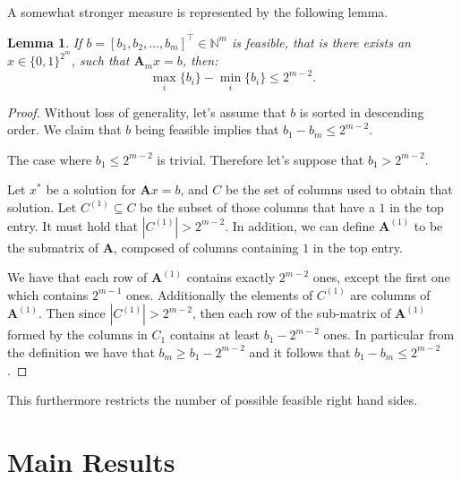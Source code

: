 \documentclass{article}
\newtheorem{lemma}[theorem]{Lemma}
\begin{document}
A somewhat stronger measure is represented by the following lemma. 
\begin{adjustwidth}{10pt}{10pt}
\begin{lemma}
If $b = [b_1, b_2, \dots, b_m]^\top \in \mathbb{N}^m$ is feasible, that is there exists an $x \in \{0,1\}^{2^m}$, such that $\mathbf{A}_mx = b$, then:
\[
\max_i\{b_i\} - \min_i\{b_i\} \leq 2^{m-2}.
\]
\end{lemma}
\begin{proof}
Without loss of generality, let's assume that $b$ is sorted in descending order. We claim that $b$ being feasible implies that $b_1 - b_m \leq 2^{m-2}$.

The case where $b_1 \leq 2^{m-2}$ is trivial. Therefore let's suppose that $b_1 > 2^{m-2}$.

Let $x^*$ be a solution for $\mathbf{A}x=b$, and $C$ be the set of columns used to obtain that solution. Let $C^{(1)} \subseteq C$ be the subset of those columns that have a $1$ in the top entry. It must hold that $\left|C^{(1)}\right|>2^{m-2}$. In addition, we can define $\mathbf{A}^{(1)}$ to be the submatrix of $\mathbf{A}$, composed of columns containing $1$ in the top entry. 

We have that each row of $\mathbf{A}^{(1)}$ contains exactly $2^{m-2}$ ones, except the first one which contains $2^{m-1}$ ones. Additionally the elements of $C^{(1)}$ are columns of $\mathbf{A}^{(1)}$. Then since $|C^{(1)}|>2^{m-2}$, then each row of the sub-matrix of $\mathbf{A}^{(1)}$ formed by the columns in $C_1$ contains at least $b_1-2^{m-2}$ ones.
In particular from the definition we have that $b_m \geq b_1-2^{m-2}$ and it follows that $b_1 - b_m \leq 2^{m-2}$.
\end{proof}
\end{adjustwidth}

This furthermore restricts the number of possible feasible right hand sides. 



\section{Main Results}
\end{document}
